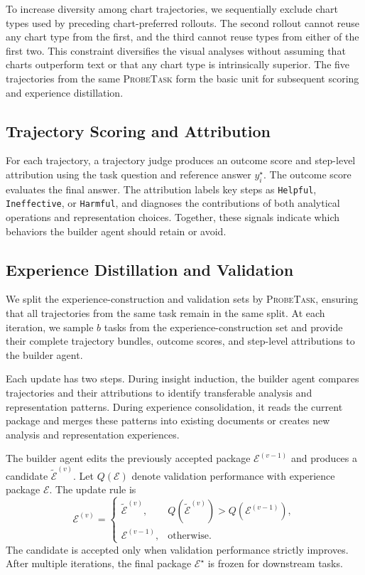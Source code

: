\documentclass{article}
\newcommand{\probe}{\textsc{ProbeTask}}
\begin{document}
To increase diversity among chart trajectories, we sequentially exclude chart types used by preceding chart-preferred rollouts.
The second rollout cannot reuse any chart type from the first, and the third cannot reuse types from either of the first two.
This constraint diversifies the visual analyses without assuming that charts outperform text or that any chart type is intrinsically superior.
The five trajectories from the same \probe{} form the basic unit for subsequent scoring and experience distillation.

\subsection{Trajectory Scoring and Attribution}
\label{sec:trajectory-attribution}

For each trajectory, a trajectory judge produces an outcome score and step-level attribution using the task question and reference answer $y_i^{\star}$.
The outcome score evaluates the final answer.
The attribution labels key steps as \texttt{Helpful}, \texttt{Ineffective}, or \texttt{Harmful}, and diagnoses the contributions of both analytical operations and representation choices.
Together, these signals indicate which behaviors the builder agent should retain or avoid.

\subsection{Experience Distillation and Validation}
\label{sec:experience-learning}

We split the experience-construction and validation sets by \probe{}, ensuring that all trajectories from the same task remain in the same split.
At each iteration, we sample $b$ tasks from the experience-construction set and provide their complete trajectory bundles, outcome scores, and step-level attributions to the builder agent.

Each update has two steps.
During insight induction, the builder agent compares trajectories and their attributions to identify transferable analysis and representation patterns.
During experience consolidation, it reads the current package and merges these patterns into existing documents or creates new analysis and representation experiences.

The builder agent edits the previously accepted package $\mathcal{E}^{(v-1)}$ and produces a candidate $\widetilde{\mathcal{E}}^{(v)}$.
Let $Q(\mathcal{E})$ denote validation performance with experience package $\mathcal{E}$.
The update rule is
\begin{equation}
\mathcal{E}^{(v)}=
\begin{cases}
\widetilde{\mathcal{E}}^{(v)},
& Q(\widetilde{\mathcal{E}}^{(v)})
>Q(\mathcal{E}^{(v-1)}),\\[4pt]
\mathcal{E}^{(v-1)},
& \text{otherwise}.
\end{cases}
\label{eq:experience-gate}
\end{equation}
The candidate is accepted only when validation performance strictly improves.
After multiple iterations, the final package $\mathcal{E}^{\star}$ is frozen for downstream tasks.
\end{document}
